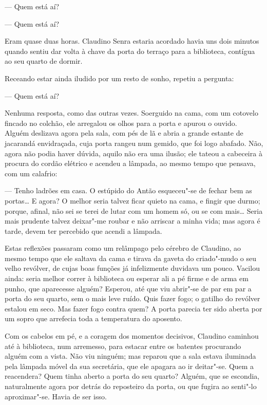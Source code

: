 --- Quem está aí?

--- Quem está aí?

Eram quase duas horas. Claudino Senra estaria acordado havia uns dois
minutos quando sentiu dar volta à chave da porta do terraço para a
biblioteca, contígua ao seu quarto de dormir.

Receando estar ainda iludido por um resto de sonho, repetiu a pergunta:

--- Quem está aí?

Nenhuma resposta, como das outras vezes. Soerguido na cama, com um
cotovelo fincado no colchão, ele arregalou os olhos para a porta e
apurou o ouvido. Alguém deslizava agora pela sala, com pés de lã e abria
a grande estante de jacarandá envidraçada,
cuja porta rangeu num gemido, que foi logo abafado. Não, agora não podia
haver dúvida,
aquilo não era uma ilusão; ele tateou a cabeceira à procura do cordão
elétrico e acendeu a lâmpada, ao mesmo tempo que pensava, com um
calafrio:

--- Tenho ladrões em casa. O estúpido do Antão esqueceu"-se de fechar bem
as portas\ldots{} E agora? O melhor seria talvez ficar quieto na cama, e
fingir que durmo; porque, afinal, não sei se terei de lutar com um homem
só, ou se com mais\ldots{} Seria mais prudente talvez deixar"-me roubar e não
arriscar a minha vida; mas agora é tarde, devem ter percebido que acendi
a lâmpada.

Estas reflexões passaram como um relâmpago pelo cérebro de Claudino, ao
mesmo tempo que ele saltava da cama e tirava da gaveta do criado"-mudo o
seu velho revólver, de cujas boas funções já infelizmente duvidava um
pouco. Vacilou ainda: seria
melhor correr à biblioteca ou esperar ali a pé firme e de arma em punho,
que aparecesse alguém? Esperou, até que viu abrir"-se de par em par a
porta do seu quarto, sem o mais leve ruído. Quis fazer fogo; o gatilho
do revólver estalou em seco. Mas fazer fogo contra quem? A porta parecia
ter sido aberta por um sopro que arrefecia toda a temperatura do
aposento.

Com os cabelos em pé, e a coragem dos momentos decisivos, Claudino
caminhou até à biblioteca, num arremesso, para estacar entre os batentes
procurando alguém com a vista. Não viu ninguém; mas reparou que a sala
estava iluminada pela lâmpada móvel da sua secretária, que ele apagara
ao ir deitar"-se. Quem a reacendera? Quem tinha aberto a porta do seu
quarto? Alguém, que se escondia, naturalmente agora por detrás do
reposteiro da porta, ou que fugira ao senti"-lo aproximar"-se. Havia de
ser isso.

